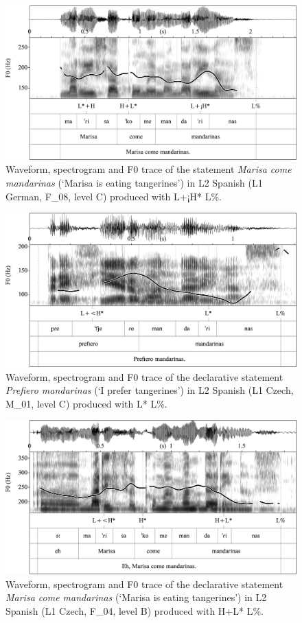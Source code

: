 \begin{figure}
\includegraphics[width=\textwidth]{figures/Figure_4.12.png}
\caption{Waveform, spectrogram and F0 trace of the statement \textit{Marisa come mandarinas} (‘Marisa is eating tangerines’) in L2 Spanish (L1 German, \mbox{F\_08}, level C) produced with L+¡H* L\%.}
\label{fig:4.12}
\end{figure}

\begin{figure}
\includegraphics[width=\textwidth]{figures/Figure_4.13.png}
\caption{Waveform, spectrogram and F0 trace of the declarative statement \textit{Prefiero mandarinas} (‘I prefer tangerines’) in L2 Spanish (L1 Czech, \mbox{M\_01}, level C) produced with L* L\%.}
\label{fig:4.13}
\end{figure}

\begin{figure}
\includegraphics[width=\textwidth]{figures/Figure_4.14.png}
\caption{Waveform, spectrogram and F0 trace of the declarative statement \textit{Marisa come mandarinas} (‘Marisa is eating tangerines’) in L2 Spanish (L1 Czech, \mbox{F\_04}, level B) produced with H+L* L\%.}
\label{fig:4.14}
\end{figure}

